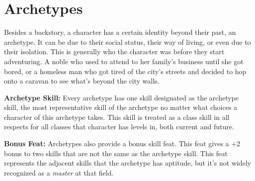 \section{Archetypes}
Besides a backstory, a character has a certain identity beyond their past, an archetype. It can be due to their social status, their way of living, or even due to their isolation. This is generally who the character was before they start adventuring. A noble who used to attend to her family's business until she got bored, or a homeless man who got tired of the city's streets and decided to hop onto a caravan to see what's beyond the city walls.

\textbf{Archetype Skill:} Every archetype has one skill designated as the archetype skill, the most representative skill of the archetype no matter what choices a character of this archetype takes. This skill is treated as a class skill in all respects for all classes that character has levels in, both current and future.

\textbf{Bonus Feat:} Archetypes also provide a bonus skill feat. This feat gives a +2 bonus to two skills that are not the same as the archetype skill. This feat represents the adjacent skills that the archetype has aptitude, but it's not widely recognized as a \emph{master} at that field.














\vskip3cm




